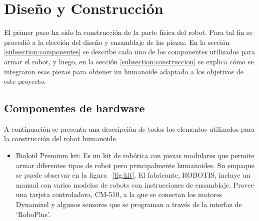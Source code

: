 
\label{chapter:diseno}
\section{Diseño y Construcción}

El primer paso ha sido la construcci\'on de la parte física del robot. Para tal fin se procedió a la elección del diseño y ensamblaje de las piezas. En la sección \ref{subsection:componentes} se describe cada uno de los componentes utilizados para armar el robot, y luego, en la secci\'on \ref{subsection:construccion} se explica cómo se integraron esas piezas para obtener un humanoide adaptado a los objetivos de este proyecto.

\label{subsection:componentes}
\subsection{Componentes de hardware}
A continuación se presenta una descripción de todos los elementos utilizados para la construcción del robot humanoide. 

\begin{itemize}
\item Bioloid Premium kit: Es un kit de robótica con piezas modulares que permite armar diferentes tipos de robot pero principalmente humanoides. Su empaque se puede observar en la figura ~\ref{fig:kit}. El fabricante, ROBOTIS, incluye un manual con varios modelos de robots con instrucciones de ensamblaje. Provee una tarjeta controladora, CM-510, a la que se conectan los motores Dynamixel y algunos sensores que se programan a través de la interfaz de ‘RoboPlus’\cite{robotics}. 

\end{itemize}

